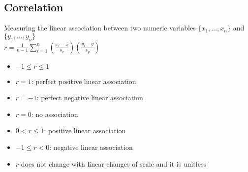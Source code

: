 \documentclass{article}
\begin{document}
\subsection{Correlation}
Measuring the linear association between two numeric variables $\{x_1,\dots,x_n\}$ and $\{y_1,\dots,y_n\}$\\
$r=\frac{1}{n-1}\sum_{i=1}^n(\frac{x_i-\overline{x}}{s_x})(\frac{y_i-\overline{y}}{s_y})$
\begin{itemize}
    \item $-1\leq r\leq 1$
    \item $r=1$: perfect positive linear association
    \item $r=-1$: perfect negative linear association
    \item $r=0$: no association
    \item $0<r\leq1$: positive linear association
    \item $-1\leq r<0$: negative linear association
    \item $r$ does not change with linear changes of scale and it is unitless
\end{itemize}
\end{document}
